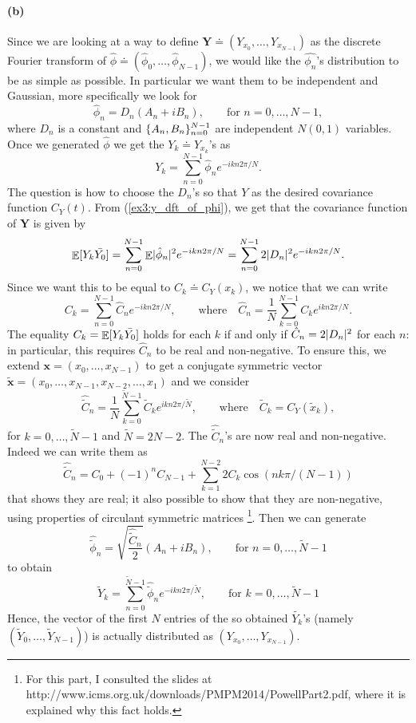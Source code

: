 \documentclass[a4paper,11pt]{article}
\theoremstyle{definition}
\theoremstyle{plain}
\theoremstyle{remark}
\DeclarePairedDelimiter{\abs}{\lvert}{\rvert}
\DeclarePairedDelimiter{\parq}{[}{]}
\DeclarePairedDelimiter{\bra}{\lbrace}{\rbrace}
\DeclareMathOperator*{\expval}{\mathbb{E}}
\begin{document}
\paragraph*{(b)} Since we are looking at a way to define $\mathbf{Y}\doteq(Y_{x_0},\dots,Y_{x_{N-1}})$ as the discrete Fourier transform of $\hat{\phi}\doteq(\hat{\phi}_0,\dots,\hat{\phi}_{N-1})$, we would like the $\hat{\phi_n}$'s distribution  to be as simple as possible. In particular we want them to be independent and Gaussian, more specifically we look for 
$$
\hat{\phi}_n = D_n(A_n+iB_n), \qquad \text{for } n=0,\dots,N-1,
$$
where $D_n$ is a constant and $\bra{A_n, B_n}_{n=0}^{N-1}$ are independent $N(0,1)$ variables. Once we generated $\hat{\phi}$ we get the $Y_k\doteq Y_{x_k}$'s as
\begin{equation}\label{ex3:y_dft_of_phi}
Y_k = \sum_{n=0}^{N-1} \hat{\phi}_ne^{-ikn2\pi/N}.
\end{equation}
The question is how to choose the $D_n$'s so that $Y$ as the desired covariance function $C_Y(t)$. From (\ref{ex3:y_dft_of_phi}), we get that the covariance function of $\mathbf{Y}$ is given by
$$
\expval\parq{Y_k\bar{Y_0}} = \sum_{n=0}^{N-1}\expval\abs{\hat{\phi}_n}^2e^{-ikn2\pi/N} = \sum_{n=0}^{N-1}2\abs{D_n}^2e^{-ikn2\pi/N}.
$$
Since we want this to be equal to $C_k \doteq C_Y(x_k)$, we notice that we can write 
$$
C_k = \sum_{n=0}^{N-1}\hat{C}_ne^{-ikn2\pi/N}, \qquad \text{where} \quad \hat{C}_n = \frac{1}{N}\sum_{k=0}^{N-1}C_ke^{ikn2\pi/N}.
$$
The equality $C_k = \expval\parq{Y_k\bar{Y_0}}$ holds for each $k$ if and only if $\hat{C}_n = 2\abs{D_n}^2$ for each $n$: in particular, this requires $\hat{C}_n$ to be real and non-negative. To ensure this, we extend $\mathbf{x} = (x_0,\dots,x_{N-1})$ to get a conjugate symmetric vector $\tilde{\mathbf{x}} = (x_0,\dots,x_{N-1},x_{N-2},\dots,x_1)$ and we consider
$$
\hat{\tilde{C}}_n = \frac{1}{N}\sum_{k=0}^{\tilde{N}-1}\tilde{C}_ke^{ikn2\pi/\tilde{N}},\qquad \text{where} \quad \tilde{C}_k = C_Y(\tilde{x}_k),
$$
for $k=0,\dots,\tilde{N}-1$ and $\tilde{N} = 2N -2$. The $\hat{\tilde{C}}_n$'s are now real and non-negative. Indeed we can write them as
$$
\hat{\tilde{C}}_n = C_0 + (-1)^nC_{N-1} + \sum_{k=1}^{N-2} 2C_k\cos(nk\pi/(N-1))
$$
that shows they are real; it also possible to show that they are non-negative, using properties of circulant symmetric matrices \footnote{For this part, I consulted the slides at http://www.icms.org.uk/downloads/PMPM2014/PowellPart2.pdf, where it is explained why this fact holds.}.
Then we can generate
$$
\hat{\tilde{\phi}}_n = \sqrt{\frac{\hat{\tilde{C}}_n}{2}}(A_n + iB_n), \qquad \text{for } n=0,\dots,\tilde{N}-1
$$
to obtain
$$
\tilde{Y}_k = \sum_{n=0}^{\tilde{N}-1} \hat{\tilde{\phi}}_ne^{-ikn2\pi/\tilde{N}}, \qquad \text{for } k=0,\dots,\tilde{N}-1
$$
Hence, the vector of the first $N$ entries of the so obtained $\tilde{Y_k}$'s (namely $(\tilde{Y}_0,\dots,\tilde{Y}_{N-1})$) is actually distributed as $(Y_{x_0},\dots,Y_{x_{N-1}})$. 
\end{document}

